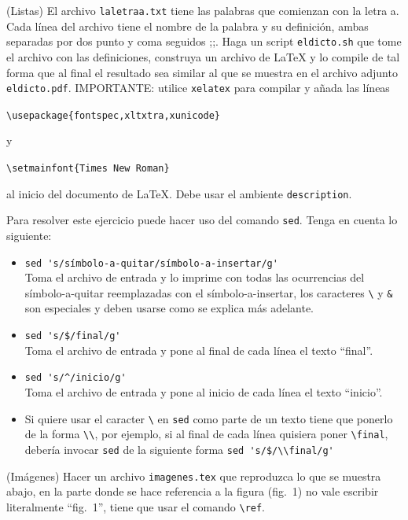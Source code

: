 \documentclass[11pt,letterpaper]{exam}
\begin{document}
\begin{questions}

\question[35] (Listas) El archivo \verb|laletraa.txt| tiene las palabras que comienzan con la letra a. Cada línea del archivo tiene el nombre de la palabra y su definición, ambas separadas por dos punto y coma seguidos ;;. Haga un script \verb+eldicto.sh+ que tome el archivo con las definiciones, construya un archivo de \LaTeX \,\,y lo compile de tal forma que al final el resultado sea similar al que se muestra en el archivo adjunto \verb+eldicto.pdf+. IMPORTANTE: utilice \verb+xelatex+ para compilar y añada las líneas 

\verb+\usepackage{fontspec,xltxtra,xunicode}+ 

y

\verb+\setmainfont{Times New Roman}+

al inicio del documento de \LaTeX. Debe usar el ambiente \verb|description|. 

Para resolver este ejercicio puede hacer uso del comando \verb|sed|. Tenga en cuenta lo siguiente:

\begin{itemize}
\item \verb"sed 's/símbolo-a-quitar/símbolo-a-insertar/g'"\\
Toma el archivo de entrada y lo imprime con todas las ocurrencias del símbolo-a-quitar reemplazadas con el símbolo-a-insertar, los caracteres \verb+\+ y \verb+&+ son especiales y deben usarse como se explica más adelante.
\item \verb"sed 's/$/final/g'" \\
Toma el archivo de entrada y pone al final de cada línea el texto ``final''.
\item \verb"sed 's/^/inicio/g'" \\
Toma el archivo de entrada y pone al inicio de cada línea el texto ``inicio''.
\item Si quiere usar el caracter \verb+\+ en \verb+sed+ como parte de un texto tiene que ponerlo de la forma \verb+\\+, por ejemplo, si al final de cada línea quisiera poner \verb+\final+, debería invocar \verb+sed+ de la siguiente forma \verb+sed 's/$/\\final/g'+
\end{itemize}

\newpage

\question[30] (Imágenes) Hacer un archivo \verb"imagenes.tex" que reproduzca lo que se muestra abajo, en la parte donde se hace referencia a la figura (fig.\ 1) no vale escribir literalmente ``fig.\ 1'', tiene que usar el comando \verb+\ref+. 


\end{questions}
\end{document}
